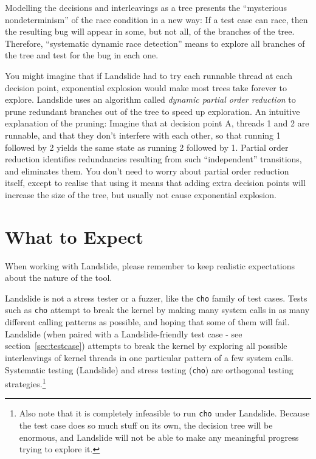 \documentclass{article}
\begin{document}
Modelling the decisions and interleavings as a tree presents the ``mysterious nondeterminism'' of the race condition in a new way: If a test case can race, then the resulting bug will appear in some, but not all, of the branches of the tree.
Therefore, ``systematic dynamic race detection'' means to explore all branches of the tree and test for the bug in each one.

You might imagine that if Landslide had to try each runnable thread at each decision point, exponential explosion would make most trees take forever to explore.
Landslide uses an algorithm called {\em dynamic partial order reduction} to prune redundant branches out of the tree to speed up exploration.
An intuitive explanation of the pruning: Imagine that at decision point A, threads 1 and 2 are runnable, and that they don't interfere with each other, so that running 1 followed by 2 yields the same state as running 2 followed by 1.
Partial order reduction identifies redundancies resulting from such ``independent'' transitions, and eliminates them.
You don't need to worry about partial order reduction itself, except to realise that using it means that adding extra decision points will increase the size of the tree, but usually not cause exponential explosion.

\section{What to Expect}
\label{sec:expect}

When working with Landslide, please remember to keep realistic expectations about the nature of the tool.

Landslide is not a stress tester or a fuzzer, like the \texttt{cho} family of test cases.
Tests such as \texttt{cho} attempt to break the kernel by making many system calls in as many different calling patterns as possible, and hoping that some of them will fail.
Landslide (when paired with a Landslide-friendly test case - see section~\ref{sec:testcase}) attempts to break the kernel by exploring all possible interleavings of kernel threads in one particular pattern of a few system calls.
Systematic testing (Landslide) and stress testing (\texttt{cho}) are orthogonal testing strategies.\footnote{Also note that it is completely infeasible to run \texttt{cho} under Landslide. Because the test case does so much stuff on its own, the decision tree will be enormous, and Landslide will not be able to make any meaningful progress trying to explore it.}
\end{document}
